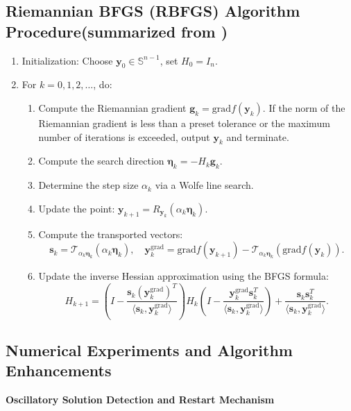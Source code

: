 \documentclass[a4paper,fleqn,numbers]{cas-sc}
\begin{document}
	\subsection[Riemannian BFGS (RBFGS) Algorithm Procedure]
	{Riemannian BFGS (RBFGS) Algorithm Procedure\hfill\small\textmd{(summarized from \cite{ring2012}\cite{huang2015})}}
	
	\begin{enumerate}
		\item Initialization: Choose $\mathbf{y}_0 \in \mathbb{S}^{n-1}$, set $H_0 = I_{n}$.
		\item For $k = 0,1,2,\ldots$, do:
		\begin{enumerate}
			\item Compute the Riemannian gradient $\mathbf{g}_k = \text{grad} f(\mathbf{y}_k)$. If the norm of the Riemannian gradient is less than a preset tolerance or the maximum number of iterations is exceeded, output $\mathbf{y}_k$ and terminate.
			\item Compute the search direction $\boldsymbol{\eta}_k = -H_k \mathbf{g}_k$.
			\item Determine the step size $\alpha_k$ via a Wolfe line search.
			\item Update the point: $\mathbf{y}_{k+1} = R_{\mathbf{y}_k}(\alpha_k \boldsymbol{\eta}_k)$.
			\item Compute the transported vectors:
			\[
			\mathbf{s}_k = \mathcal{T}_{\alpha_k \boldsymbol{\eta}_k}(\alpha_k \boldsymbol{\eta}_k), \quad
			\mathbf{y}_k^{\text{grad}} = \text{grad} f(\mathbf{y}_{k+1}) - \mathcal{T}_{\alpha_k \boldsymbol{\eta}_k}(\text{grad} f(\mathbf{y}_k)).
			\]
			\item Update the inverse Hessian approximation using the BFGS formula:
			\[
			H_{k+1} = \left(I - \frac{\mathbf{s}_k (\mathbf{y}_k^{\text{grad}})^T}{\langle \mathbf{s}_k, \mathbf{y}_k^{\text{grad}} \rangle} \right) H_k \left(I - \frac{\mathbf{y}_k^{\text{grad}} \mathbf{s}_k^T}{\langle \mathbf{s}_k, \mathbf{y}_k^{\text{grad}} \rangle} \right) + \frac{\mathbf{s}_k \mathbf{s}_k^T}{\langle \mathbf{s}_k, \mathbf{y}_k^{\text{grad}} \rangle}.
			\]
		\end{enumerate}
	\end{enumerate}
	
	\subsection{Numerical Experiments and Algorithm Enhancements}
	
	\textbf{Oscillatory Solution Detection and Restart Mechanism}
	
\end{document}
